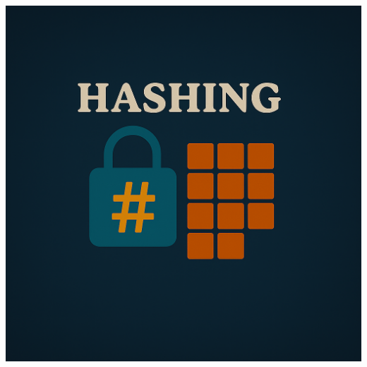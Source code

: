 \documentclass[a4paper,10pt]{book}
\begin{document}
\begin{center}
\includegraphics[height=13.88cm, width=17cm, keepaspectratio]{Pics/hashing.png}
\end{center}
\end{document}
